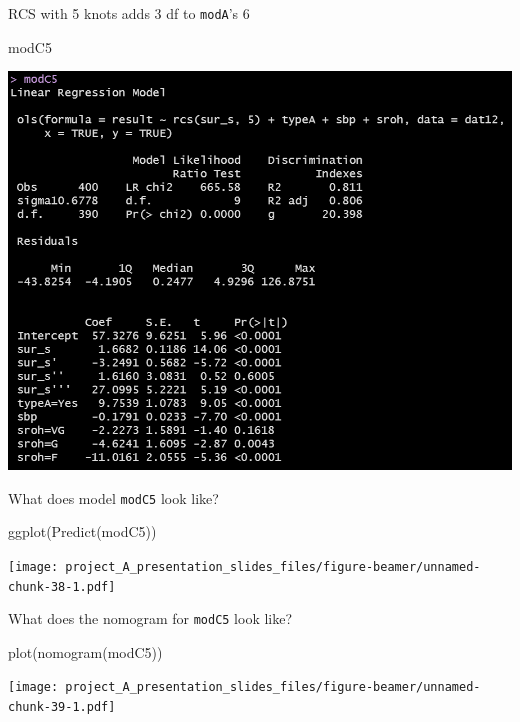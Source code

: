\documentclass[
  ignorenonframetext,
]{beamer}
\newenvironment{Shaded}{\begin{snugshade}}{\end{snugshade}}
\newcommand{\FunctionTok}[1]{\textcolor[rgb]{0.00,0.00,0.00}{#1}}
\newcommand{\NormalTok}[1]{#1}
\begin{document}
\begin{frame}[fragile]{RCS with 5 knots adds 3 df to \texttt{modA}'s 6}
\protect\hypertarget{rcs-with-5-knots-adds-3-df-to-modas-6}{}
\begin{Shaded}
\begin{Highlighting}[]
\NormalTok{modC5}
\end{Highlighting}
\end{Shaded}

\begin{center}\includegraphics[width=12.44in,height=0.65\textheight]{figures/small6} \end{center}
\end{frame}

\begin{frame}[fragile]{What does model \texttt{modC5} look like?}
\protect\hypertarget{what-does-model-modc5-look-like}{}
\begin{Shaded}
\begin{Highlighting}[]
\FunctionTok{ggplot}\NormalTok{(}\FunctionTok{Predict}\NormalTok{(modC5))}
\end{Highlighting}
\end{Shaded}

\texttt{[image: project\_A\_presentation\_slides\_files/figure-beamer/unnamed-chunk-38-1.pdf]}
\end{frame}

\begin{frame}[fragile]{What does the nomogram for \texttt{modC5} look
like?}
\protect\hypertarget{what-does-the-nomogram-for-modc5-look-like}{}
\begin{Shaded}
\begin{Highlighting}[]
\FunctionTok{plot}\NormalTok{(}\FunctionTok{nomogram}\NormalTok{(modC5))}
\end{Highlighting}
\end{Shaded}

\texttt{[image: project\_A\_presentation\_slides\_files/figure-beamer/unnamed-chunk-39-1.pdf]}
\end{frame}
\end{document}

